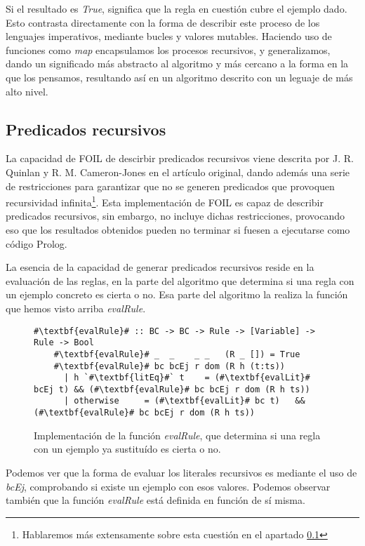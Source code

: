 Si el resultado es \emph{True}, significa que la regla en cuestión cubre el ejemplo dado. Esto contrasta directamente con la forma de describir este proceso de los lenguajes imperativos, mediante bucles y valores mutables. Haciendo uso de funciones como \emph{map} encapsulamos los procesos recursivos, y generalizamos, dando un significado más abstracto al algoritmo y más cercano a la forma en la que los pensamos, resultando así en un algoritmo descrito con un leguaje de más alto nivel.

\subsection{Predicados recursivos}
La capacidad de FOIL de descirbir predicados recursivos viene descrita por J. R. Quinlan y R. M. Cameron-Jones en el artículo original, dando además una serie de restricciones para garantizar que no se generen predicados que provoquen recursividad infinita\footnote{Hablaremos más extensamente sobre esta cuestión en el apartado \ref{}}. Esta implementación de FOIL es capaz de describir predicados recursivos, sin embargo, no incluye dichas restricciones, provocando eso que los resultados obtenidos pueden no terminar si fuesen a ejecutarse como código Prolog.

La esencia de la capacidad de generar predicados recursivos reside en la evaluación de las reglas, en la parte del algoritmo que determina si una regla con un ejemplo concreto es cierta o no. Esa parte del algoritmo la realiza la función que hemos visto arriba \emph{evalRule}.

\begin{figure}
  \begin{lstlisting}[escapechar=\#]
    #\textbf{evalRule}# :: BC -> BC -> Rule -> [Variable] -> Rule -> Bool
    #\textbf{evalRule}# _  _    _ _   (R _ []) = True
    #\textbf{evalRule}# bc bcEj r dom (R h (t:ts))
      | h `#\textbf{litEq}#` t    = (#\textbf{evalLit}# bcEj t) && (#\textbf{evalRule}# bc bcEj r dom (R h ts))
      | otherwise     = (#\textbf{evalLit}# bc t)   && (#\textbf{evalRule}# bc bcEj r dom (R h ts))
  \end{lstlisting}
  \caption{Implementación de la función \emph{evalRule}, que determina si una regla con un ejemplo ya sustituído es cierta o no.}
\end{figure}

Podemos ver que la forma de evaluar los literales recursivos es mediante el uso de \emph{bcEj}, comprobando si existe un ejemplo con esos valores. Podemos observar también que la función \emph{evalRule} está definida en función de sí misma.
